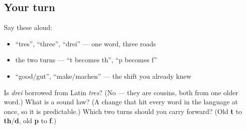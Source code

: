 \subsection*{Your turn}
Say these aloud:

\begin{itemize}
\raggedright
  \item \textquotedblleft{}tres\textquotedblright{}, \textquotedblleft{}three\textquotedblright{}, \textquotedblleft{}drei\textquotedblright{} — one word, three roads
  \item the two turns — \textquotedblleft{}t becomes th\textquotedblright{}, \textquotedblleft{}p becomes f\textquotedblright{}
  \item \textquotedblleft{}good/gut\textquotedblright{}, \textquotedblleft{}make/machen\textquotedblright{} — the shift you already knew
\end{itemize}

\begin{tcolorbox}[breakable,colback=teal!4,colframe=teal!35!black,title={Before you move on}]
Is \emph{drei} borrowed from Latin \emph{tres}? (No — they are cousins, both from one older word.) What is a sound law? (A change that hit every word in the language at once, so it is predictable.) Which two turns should you carry forward? (Old \textbf{t} to \textbf{th}/\textbf{d}, old \textbf{p} to \textbf{f}.)
\end{tcolorbox}
